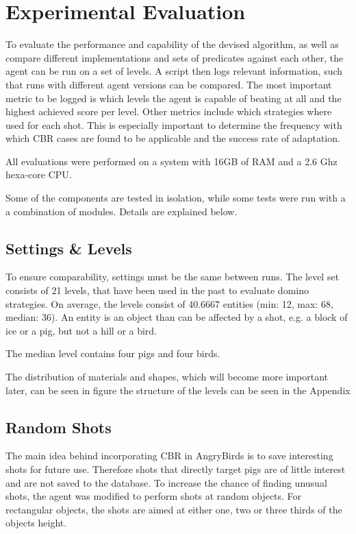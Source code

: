 \section{Experimental Evaluation}\label{sec:experimental}
To evaluate the performance and capability of the devised algorithm, as well as compare different implementations and sets of predicates against each other, the agent can be run on a set of levels.
A script then logs relevant information, such that runs with different agent versions can be compared.
The most important metric to be logged is which levels the agent is capable of beating at all and the highest achieved score per level.
Other metrics include which strategies where used for each shot.
This is especially important to determine the frequency with which \acs{CBR} cases are found to be applicable and the success rate of adaptation.

All evaluations were performed on a system with 16GB of RAM and a 2.6 Ghz hexa-core CPU.

Some of the components are tested in isolation, while some tests were run with a a combination of modules. Details are explained below.


\subsection{Settings \& Levels}\label{subsec:experimental-settings}
To ensure comparability, settings must be the same between runs.
The level set consists of 21 levels, that have been used in the past to evaluate domino strategies. On average, the levels consist of 40.6667 entities (min: 12, max: 68, median: 36). An entity is an object than can be affected by a shot, e.g. a block of ice or a pig, but not a hill or a bird.

The median level contains four pigs and four birds.

The distribution of materials and shapes, which will become more important later, can be seen in figure %
the structure of the levels can be seen in the Appendix %




\subsection{Random Shots}\label{subsec:experimental-random-shots}
The main idea behind incorporating CBR in AngryBirds is to save interesting shots for future use. Therefore shots that directly target pigs are of little interest and are not saved to the database.
To increase the chance of finding unusual shots, the agent was modified to perform shots at random objects. For rectangular objects, the shots are aimed at either one, two or three thirds of the objects height.


